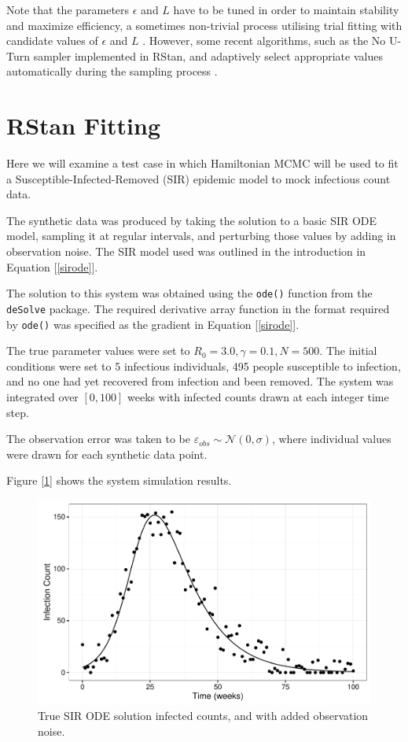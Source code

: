     Note that the parameters $\epsilon$ and $L$ have to be tuned in order to maintain stability and maximize efficiency, a sometimes non-trivial process utilising trial fitting with candidate values of $\epsilon$ and $L$ \cite{Neal2011}. However, some recent algorithms, such as the No U-Turn sampler implemented in RStan, and adaptively select appropriate values automatically during the sampling process \cite{Hoffman2014}.
    

\section{RStan Fitting}

    Here we will examine a test case in which Hamiltonian MCMC will be used to fit a Susceptible-Infected-Removed (SIR) epidemic model to mock infectious count data.

    The synthetic data was produced by taking the solution to a basic SIR ODE model, sampling it at regular intervals, and perturbing those values by adding in observation noise. The SIR model used was outlined in the introduction in Equation [\ref{sirode}].

    The solution to this system was obtained using the \verb|ode()| function from the \verb|deSolve| package. The required derivative array function in the format required by \verb|ode()| was specified as the gradient in Equation [\ref{sirode}].

    The true parameter values were set to $R_0 = 3.0, \gamma = 0.1, N = 500$. The initial conditions were set to 5 infectious individuals, 495 people susceptible to infection, and no one had yet recovered from infection and been removed. The system was integrated over $[0,100]$ weeks with infected counts drawn at each integer time step.

    The observation error was taken to be $\varepsilon_{obs} \sim \mathcal{N}(0,\sigma)$, where individual values were drawn for each synthetic data point.

    Figure [\ref{mcmcdataplot}] shows the system simulation results.

    \begin{figure}
        \centering
        \includegraphics[width=\textwidth]{./images/dataplot.pdf}
        \caption{True SIR ODE solution infected counts, and with added observation noise. \label{mcmcdataplot}}
    \end{figure}

